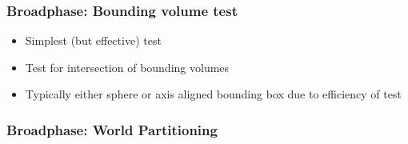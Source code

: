 \documentclass[a4paper]{article}
\begin{document}
\subsubsection{Broadphase: Bounding volume test}

\begin{itemize}
  \item
    Simplest (but effective) test

  \item
    Test for intersection of bounding volumes

  \item
    Typically either sphere or axis aligned bounding box due to efficiency of
    test

\end{itemize}

\subsubsection{Broadphase: World Partitioning}
\end{document}

